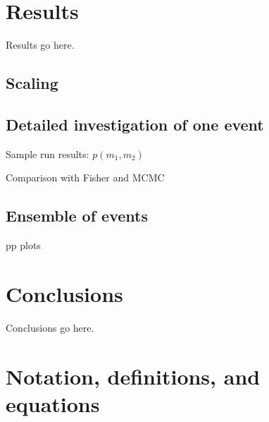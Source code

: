 \documentclass[twocolumn,prd,nofootinbib]{revtex4}
\begin{document}
\section{Results}

Results go here.

\subsection{Scaling}

\subsection{Detailed investigation of one event}

Sample run results: $p(m_1,m_2)$

Comparison with Fisher and MCMC

\subsection{Ensemble of events}

pp plots


\section{Conclusions}

Conclusions go here.

\appendix


\section{Notation, definitions, and equations}
\end{document}
